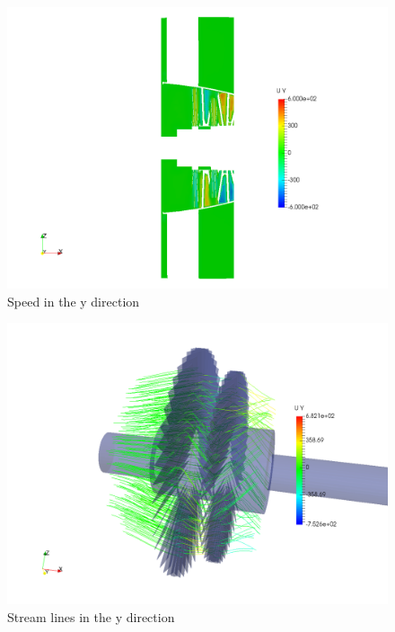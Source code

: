\begin{figure}[h!]
\centering
\includegraphics[scale=0.28]{./img/screenshoots/Uy2.png}
\caption{Speed in the y direction}
\label{uy2}
\end{figure}

\begin{figure}[h!]
\centering
\includegraphics[scale=0.28]{./img/screenshoots/Uy3.png}
\caption{Stream lines in the y direction}
\label{uy3}
\end{figure}

\newpage{}


